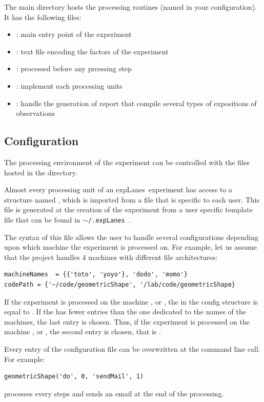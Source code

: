 \documentclass[a4paper,fleqn]{tufte-handout}
\newcommand{\explanes}{\textsf{expLanes}\ }
\begin{document}
The main directory hosts the processing routines (named  in your configuration). It has the following files:
\begin{itemize}
\item {}: main entry point of the experiment
\item {}: text file encoding the factors of the experiment
\item {}: processed before any prcessing step
\item {}: implement each processing units
\item {}: handle the generation of report that compile several types of expositions of observations
\end{itemize}

\subsection{Configuration}

The processing environment of the experiment can be controlled with the files hosted in the  directory.

Almost every processing unit of an \explanes experiment has access to a structure named , which is imported from a file that is specific to each user. This file is generated at the creation of the experiment from a user specific template file that can be found in \texttt{$\sim$/.\explanes}.

The syntax of this file allows the user to handle several configurations depending upon which machine the experiment is processed on. For example, let us assume that the project handles 4 machines with different file architectures:
\begin{lstlisting}
machineNames  = {{'toto', 'yoyo'}, 'dodo', 'momo'}
codePath = {'~/code/geometricShape', '/lab/code/geometricShape}
\end{lstlisting}
If the experiment is processed on the machine , or , the  in the config structure is equal to .  If the  has fewer entries than the one dedicated to the names of the machines, the last entry is chosen. Thus, if the experiment is processed on the machine , or , the second entry is chosen, that is .

Every entry of the configuration file can be overwritten at the command line call. For example:
\begin{lstlisting}
geometricShape('do', 0, 'sendMail', 1)
\end{lstlisting}
processes every steps and sends an email at the end of the processing.
\end{document}
